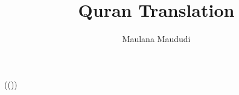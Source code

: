 \documentclass{report}
\title{{Quran Translation}}
\author{{Maulana Maududi}}
\def\surna[#1]{\centerline{\hss\surahname[#1]\hss\lr{\surahname[#1]}\hss}}
\def\test#1{
    \par
    \surna[#1]
    \quransurah*[#1]
    \bigskip
}
\begin{document}
%
\begin{arab}
\quranayah*[2][256](()) %
\end{arab}

















\end{document}
